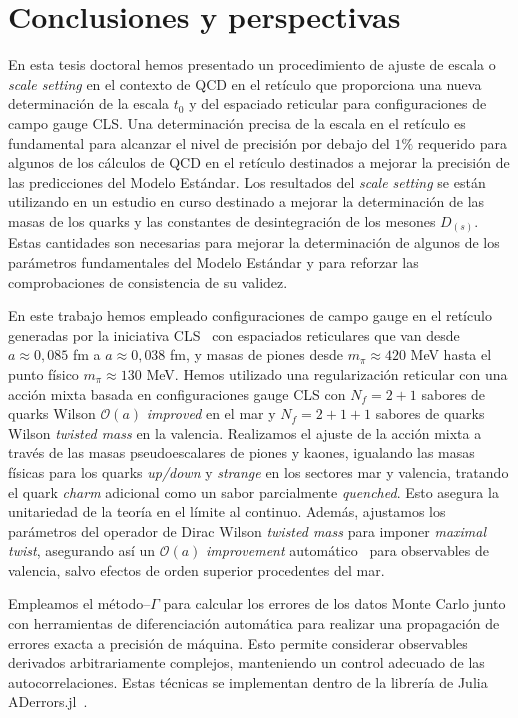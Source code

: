 \chapter*{Conclusiones y perspectivas}

En esta tesis doctoral hemos presentado un procedimiento de ajuste de escala o \textit{scale setting} en el contexto de QCD en el retículo que proporciona una nueva determinación de la escala $t_0$ y del espaciado reticular para configuraciones de campo gauge CLS. Una determinación precisa de la escala en el retículo es fundamental para alcanzar el nivel de precisión por debajo del $1\%$ requerido para algunos de los cálculos de QCD en el retículo destinados a mejorar la precisión de las predicciones del Modelo Estándar. Los resultados del \textit{scale setting} se están utilizando en un estudio en curso destinado a mejorar la determinación de las masas de los quarks y las constantes de desintegración de los mesones $D_{(s)}$. Estas cantidades son necesarias para mejorar la determinación de algunos de los parámetros fundamentales del Modelo Estándar y para reforzar las comprobaciones de consistencia de su validez.

En este trabajo hemos empleado configuraciones de campo gauge en el retículo generadas por la iniciativa CLS~\citep{Bruno:2014jqa,Mohler:2017wnb} con espaciados reticulares que van desde $a\approx0,085$ fm a $a\approx0,038$ fm, y masas de piones desde $m_{\pi}\approx420$ MeV hasta el punto físico $m_{\pi}\approx130$ MeV. Hemos utilizado una regularización reticular con una acción mixta basada en configuraciones gauge CLS con $N_f=2+1$ sabores de quarks Wilson $\mathcal{O}(a)$ \textit{improved} en el mar y $N_f=2+1+1$ sabores de quarks Wilson \textit{twisted mass} en la valencia. Realizamos el ajuste de la acción mixta a través de las masas pseudoescalares de piones y kaones, igualando las masas físicas para los quarks \textit{up/down} y \textit{strange} en los sectores mar y valencia, tratando el quark \textit{charm} adicional como un sabor parcialmente \textit{quenched}. Esto asegura la unitariedad de la teoría en el límite al continuo. Además, ajustamos los parámetros del operador de Dirac Wilson \textit{twisted mass} para imponer \textit{maximal twist}, asegurando así un $\mathcal{O}(a)$ \textit{improvement} automático~\citep{Frezzotti:2003ni,Shindler:2007vp} para observables de valencia, salvo efectos de orden superior procedentes del mar.

Empleamos el método--$\Gamma$ para calcular los errores de los datos Monte Carlo junto con herramientas de diferenciación automática para realizar una propagación de errores exacta a precisión de máquina. Esto permite considerar observables derivados arbitrariamente complejos, manteniendo un control adecuado de las autocorrelaciones. Estas técnicas se implementan dentro de la librería de Julia ADerrors.jl~\citep{Ramos:2018vgu,Ramos:2020scv}. 

